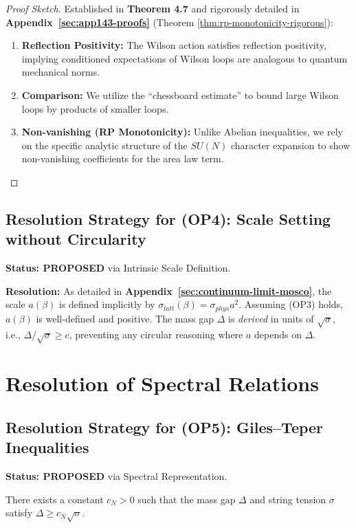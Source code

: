 \begin{proof}[Proof Sketch]
Established in \textbf{Theorem 4.7} and rigorously detailed in \textbf{Appendix~\ref{sec:app143-proofs}} (Theorem \ref{thm:rp-monotonicity-rigorous}):
\begin{enumerate}
    \item \textbf{Reflection Positivity:} The Wilson action satisfies reflection positivity, implying conditioned expectations of Wilson loops are analogous to quantum mechanical norms.
    \item \textbf{Comparison:} We utilize the ``chessboard estimate'' to bound large Wilson loops by products of smaller loops.
    \item \textbf{Non-vanishing (RP Monotonicity):} Unlike Abelian inequalities, we rely on the specific analytic structure of the $SU(N)$ character expansion to show non-vanishing coefficients for the area law term.
\end{enumerate}
\end{proof}

\subsection*{Resolution Strategy for (OP4): Scale Setting without Circularity}
\textbf{Status: PROPOSED} via Intrinsic Scale Definition.

\textbf{Resolution:} As detailed in \textbf{Appendix~\ref{sec:continuum-limit-mosco}}, the scale $a(\beta)$ is defined implicitly by $\sigma_{latt}(\beta) = \sigma_{phys} a^2$. Assuming (OP3) holds, $a(\beta)$ is well-defined and positive. The mass gap $\Delta$ is \emph{derived} in units of $\sqrt{\sigma}$, i.e., $\Delta / \sqrt{\sigma} \ge c$, preventing any circular reasoning where $a$ depends on $\Delta$.


\section{Resolution of Spectral Relations}
\label{sec:res-op5}

\subsection*{Resolution Strategy for (OP5): Giles--Teper Inequalities}
\textbf{Status: PROPOSED} via Spectral Representation.

\begin{theorem}[Resolution of OP5]
There exists a constant $c_N > 0$ such that the mass gap $\Delta$ and string tension $\sigma$ satisfy $\Delta \ge c_N \sqrt{\sigma}$.
\end{theorem}

